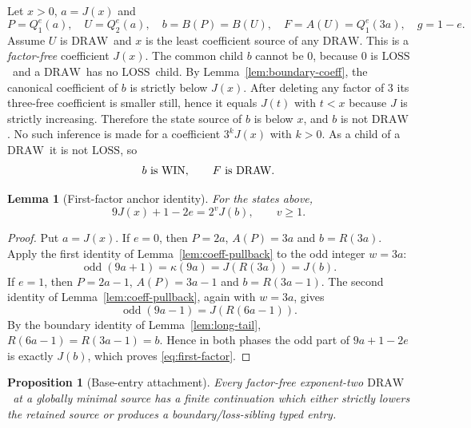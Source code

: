 \documentclass[11pt]{article}
\newtheorem{lemma}[theorem]{Lemma}
\newtheorem{proposition}[theorem]{Proposition}
\newcommand{\WIN}{\ensuremath{\mathrm{WIN}}}
\newcommand{\LOSS}{\ensuremath{\mathrm{LOSS}}}
\newcommand{\DRAW}{\ensuremath{\mathrm{DRAW}}}
\newcommand{\odd}{\operatorname{odd}}
\begin{document}
Let $x>0$, $a=J(x)$ and
\[
  P=Q_1^e(a),\quad U=Q_2^e(a),\quad
  b=B(P)=B(U),\quad F=A(U)=Q_1^e(3a),\quad g=1-e.
\]
Assume $U$ is \DRAW\ and $x$ is the least coefficient source of any \DRAW.  This is a \emph{factor-free} coefficient $J(x)$.  The common child $b$ cannot be $0$, because $0$ is \LOSS\ and a \DRAW\ has no \LOSS\ child.  By Lemma~\ref{lem:boundary-coeff}, the canonical coefficient of $b$ is strictly below $J(x)$.  After deleting any factor of $3$ its three-free coefficient is smaller still, hence it equals $J(t)$ with $t<x$ because $J$ is strictly increasing.  Therefore the state source of $b$ is below $x$, and $b$ is not \DRAW.  No such inference is made for a coefficient $3^kJ(x)$ with $k>0$.
As a child of a \DRAW\ it is not \LOSS, so
\[
  b\text{ is \WIN},\qquad F\text{ is \DRAW}.
\]
\begin{lemma}[First-factor anchor identity]\label{lem:first-factor}
For the states above,
\begin{equation}\label{eq:first-factor}
  9J(x)+1-2e=2^vJ(b),\qquad v\ge1.
\end{equation}
\end{lemma}

\begin{proof}
Put $a=J(x)$. If $e=0$, then $P=2a$, $A(P)=3a$ and $b=R(3a)$.
Apply the first identity of Lemma~\ref{lem:coeff-pullback} to the odd integer
$w=3a$:
\[
 \odd(9a+1)=\kappa(9a)=J(R(3a))=J(b).
\]
If $e=1$, then $P=2a-1$, $A(P)=3a-1$ and $b=R(3a-1)$. The second identity
of Lemma~\ref{lem:coeff-pullback}, again with $w=3a$, gives
\[
 \odd(9a-1)=J(R(6a-1)).
\]
By the boundary identity of Lemma~\ref{lem:long-tail},
$R(6a-1)=R(3a-1)=b$. Hence in both phases the odd part of
$9a+1-2e$ is exactly $J(b)$, which proves \eqref{eq:first-factor}.
\end{proof}

\begin{proposition}[Base-entry attachment]\label{prop:base-entry}
Every factor-free exponent-two \DRAW\ at a globally minimal source has a
finite continuation which either strictly lowers the retained source or
produces a boundary/loss-sibling typed entry.
\end{proposition}
\end{document}
